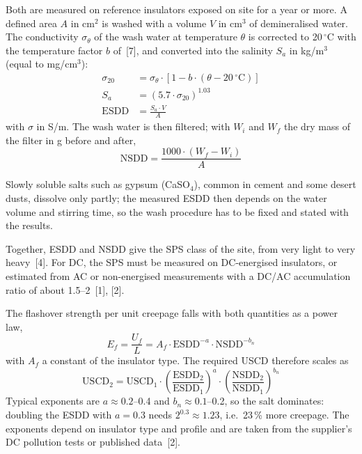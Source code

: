 Both are measured on reference insulators exposed on site for a year or more.
A defined area $A$ in cm$^2$ is washed with a volume $V$ in cm$^3$ of
demineralised water. The conductivity $\sigma_{\theta}$ of the wash water at
temperature $\theta$ is corrected to 20\,$^{\circ}$C with the temperature
factor $b$ of~[7], and converted into the salinity $S_{a}$ in kg/m$^3$
(equal to mg/cm$^3$):
\begin{align}
  \sigma_{20} &= \sigma_{\theta} \cdot \left[1 - b \cdot (\theta - 20\,^{\circ}\mathrm{C})\right] \\
  S_{a} &= \left(5.7 \cdot \sigma_{20}\right)^{1.03} \\
  \mathrm{ESDD} &= \frac{S_{a} \cdot V}{A}
\end{align}
with $\sigma$ in S/m. The wash water is then filtered; with $W_{i}$ and
$W_{f}$ the dry mass of the filter in g before and after,
\begin{equation}
  \mathrm{NSDD} = \frac{1000 \cdot (W_{f} - W_{i})}{A}
\end{equation}

Slowly soluble salts such as gypsum (CaSO$_4$), common in cement and some
desert dusts, dissolve only partly; the measured ESDD then depends on the
water volume and stirring time, so the wash procedure has to be fixed and
stated with the results.

Together, ESDD and NSDD give the SPS class of the site, from very light to
very heavy~[4]. For DC, the SPS must be measured on DC-energised insulators,
or estimated from AC or non-energised measurements with a DC/AC accumulation
ratio of about 1.5--2~[1], [2].

The flashover strength per unit creepage falls with both quantities as a
power law,
\begin{equation}
  E_{f} = \frac{U_{f}}{L} = A_{f} \cdot \mathrm{ESDD}^{-a} \cdot \mathrm{NSDD}^{-b_{n}}
\end{equation}
with $A_{f}$ a constant of the insulator type. The required USCD therefore
scales as
\begin{equation}
  \mathrm{USCD}_{2} = \mathrm{USCD}_{1}
    \cdot \left(\frac{\mathrm{ESDD}_{2}}{\mathrm{ESDD}_{1}}\right)^{a}
    \cdot \left(\frac{\mathrm{NSDD}_{2}}{\mathrm{NSDD}_{1}}\right)^{b_{n}}
\end{equation}
Typical exponents are $a \approx 0.2$--0.4 and $b_{n} \approx 0.1$--0.2, so
the salt dominates: doubling the ESDD with $a = 0.3$ needs
$2^{0.3} \approx 1.23$, i.e.\ 23\,\% more creepage. The exponents depend on
insulator type and profile and are taken from the supplier's DC pollution
tests or published data~[2].

